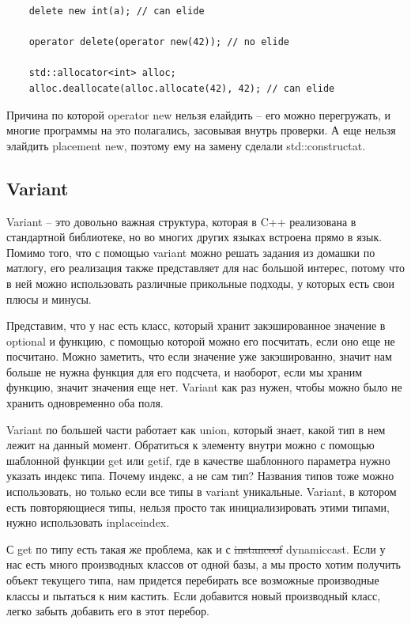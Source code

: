 \documentclass[12pt, a4paper]{article}
\begin{document}
\begin{verbatim}
	delete new int(a); // can elide
	
	operator delete(operator new(42)); // no elide
	
	std::allocator<int> alloc;
	alloc.deallocate(alloc.allocate(42), 42); // can elide
\end{verbatim}
Причина по которой operator new нельзя елайдить -- его можно перегружать, и многие программы на это полагались, засовывая внутрь проверки. А еще нельзя элайдить placement new, поэтому ему на замену сделали std::construct\textunderscore at.
\subsection{Variant}
Variant -- это довольно важная структура, которая в C++ реализована в стандартной библиотеке, но во многих других языках встроена прямо в язык. Помимо того, что с помощью variant можно решать задания из домашки по матлогу, его реализация также представляет для нас большой интерес, потому что в ней можно использовать различные прикольные подходы, у которых есть свои плюсы и минусы.
\par Представим, что у нас есть класс, который хранит закэшированное значение в optional и функцию, с помощью которой можно его посчитать, если оно еще не посчитано. Можно заметить, что если значение уже закэшированно, значит нам больше не нужна функция для его подсчета, и наоборот, если мы храним функцию, значит значения еще нет. Variant как раз нужен, чтобы можно было не хранить одновременно оба поля.
\par Variant по большей части работает как union, который знает, какой тип в нем лежит на данный момент. Обратиться к элементу внутри можно с помощью шаблонной функции get или get\textunderscore if, где в качестве шаблонного параметра нужно указать индекс типа. Почему индекс, а не сам тип? Названия типов тоже можно использовать, но только если все типы в variant уникальные. Variant, в котором есть повторяющиеся типы, нельзя просто так инициализировать этими типами, нужно использовать in\textunderscore place\textunderscore index.
\par С get по типу есть такая же проблема, как и с \sout{instanceof} dynamic\textunderscore cast. Если у нас есть много производных классов от одной базы, а мы просто хотим получить объект текущего типа, нам придется перебирать все возможные производные классы и пытаться к ним кастить. Если добавится новый производный класс, легко забыть добавить его в этот перебор.
\end{document}
